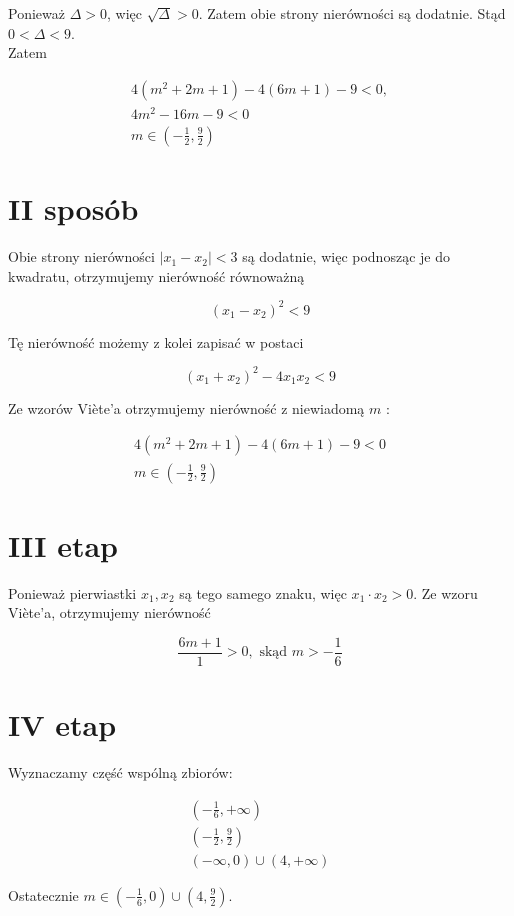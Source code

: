 \documentclass[10pt]{article}
\begin{document}
Ponieważ $\Delta>0$, więc $\sqrt{\Delta}>0$. Zatem obie strony nierówności są dodatnie. Stąd $0<\Delta<9$.\\
Zatem

$$
\begin{gathered}
4\left(m^{2}+2 m+1\right)-4(6 m+1)-9<0, \\
4 m^{2}-16 m-9<0 \\
m \in\left(-\frac{1}{2}, \frac{9}{2}\right)
\end{gathered}
$$

\section*{II sposób}
Obie strony nierówności $\left|x_{1}-x_{2}\right|<3$ są dodatnie, więc podnosząc je do kwadratu, otrzymujemy nierówność równoważną

$$
\left(x_{1}-x_{2}\right)^{2}<9
$$

Tę nierówność możemy z kolei zapisać w postaci

$$
\left(x_{1}+x_{2}\right)^{2}-4 x_{1} x_{2}<9
$$

Ze wzorów Viète'a otrzymujemy nierówność z niewiadomą $m$ :

$$
\begin{gathered}
4\left(m^{2}+2 m+1\right)-4(6 m+1)-9<0 \\
m \in\left(-\frac{1}{2}, \frac{9}{2}\right)
\end{gathered}
$$

\section*{III etap}
Ponieważ pierwiastki $x_{1}, x_{2}$ są tego samego znaku, więc $x_{1} \cdot x_{2}>0$. Ze wzoru Viète'a, otrzymujemy nierówność

$$
\frac{6 m+1}{1}>0, \text { skąd } m>-\frac{1}{6}
$$

\section*{IV etap}
Wyznaczamy część wspólną zbiorów:

$$
\begin{gathered}
\left(-\frac{1}{6},+\infty\right) \\
\left(-\frac{1}{2}, \frac{9}{2}\right) \\
(-\infty, 0) \cup(4,+\infty)
\end{gathered}
$$

Ostatecznie $m \in\left(-\frac{1}{6}, 0\right) \cup\left(4, \frac{9}{2}\right)$.
\end{document}
